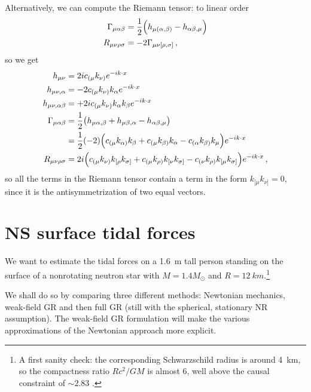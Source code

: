 \documentclass[main.tex]{subfiles}
\begin{document}
Alternatively, we can compute the Riemann tensor: to linear order 
%
\begin{align}
\Gamma_{\mu \alpha \beta } &= \frac{1}{2} \qty(h_{\mu  (\alpha , \beta )} - h_{\alpha \beta , \mu })  \\
R_{\mu \nu \rho \sigma } &= - 2 \Gamma_{\mu \nu [\rho , \sigma ]}
\,,
\end{align}
%
so we get 
%
\begin{align}
h_{\mu \nu } &= 2 i c_{(\mu } k_{\nu )} e^{-i k \cdot x}  \\
h_{\mu \nu , \alpha } &= - 2 c_{(\mu } k_{\nu )} k_\alpha e^{-i k \cdot x} \\
h_{\mu \nu , \alpha \beta } &= + 2 i c_{(\mu } k_{\nu )} k_\alpha k_\beta e^{- i k \cdot x} \\
\Gamma_{\mu \alpha \beta } &= \frac{1}{2} \qty( h_{\mu \alpha , \beta } + h_{\mu \beta, \alpha } - h_{\alpha \beta , \mu })  \\
&= \frac{1}{2} (-2) \qty(
    c_{(\mu } k_{\alpha  )} k_\beta + 
    c_{(\mu } k_{\beta   )} k_\alpha -
    c_{(\alpha  } k_{\beta   )} k_\mu 
)
e^{-i k \cdot x}  \\
R_{\mu \nu \rho \sigma } &=
2 i \qty(
    c_{(\mu } k_{\nu)}  k_{[\rho} k_{\sigma ]} +  
    c_{(\mu } k_{\rho)} k_{[\nu } k_{\sigma ]} -
    c_{(\nu } k_{\rho)} k_{[\mu } k_{\sigma ]}    
) e^{- i k \cdot x}
\,,
\end{align}
%
so all the terms in the Riemann tensor contain a term in the form \(k_{[\mu } k_{\nu ]} = 0\), since it is the antisymmetrization of two equal vectors. 

\section{NS surface tidal forces}

We want to estimate the tidal forces on a \SI{1.6}{m} tall person standing on the surface of a nonrotating neutron star with \(M = 1.4 M_{\odot}\) and \(R = \SI{12}{km}\).\footnote{A first sanity check: the corresponding Schwarzschild radius is around \SI{4}{km}, so the compactness ratio \(R c^2 / G M\) is almost 6, well above the causal constraint of \(\sim 2.83\) \cite[eq.\ 5, fig.\ 2]{lattimerNeutronStarObservations2007a}.}

We shall do so by comparing three different methods: Newtonian mechanics, weak-field GR and then full GR (still with the spherical, stationary NR assumption).
The weak-field GR formulation will make the various approximations of the Newtonian approach more explicit. 
\end{document}
